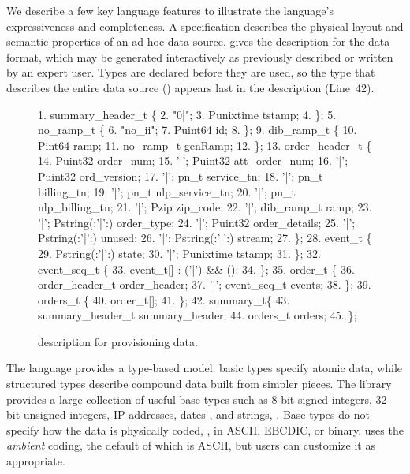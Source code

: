 We describe a few key language features to illustrate the language's
expressiveness and completeness.  A \pads{} specification describes
the physical layout and semantic properties of an ad hoc data source.
 gives the \pads{} description for the
\dibbler{} data format, which may be generated interactively as
previously described or written by an expert user.  Types are declared
before they are used, so the type that describes the entire data
source () appears last in the description (Line~42).
\begin{figure}
\begin{scriptsize}
\begin{code}
{ 1}.   summary\_header\_t \{
{ 2}.  "0|";
{ 3}.  Punixtime tstamp;
{ 4}. \};
{ 5}.  no\_ramp\_t \{
{ 6}.  "no\_ii";
{ 7}.  Puint64 id;
{ 8}. \};
{ 9}.  dib\_ramp\_t \{
{10}.   Pint64     ramp;
{11}.   no\_ramp\_t  genRamp;
{12}. \};
{13}.  order\_header\_t \{
{14}.        Puint32             order\_num;
{15}.  '|';  Puint32             att\_order\_num;
{16}.  '|';  Puint32             ord\_version;
{17}.  '|';   pn\_t           service\_tn;
{18}.  '|';   pn\_t           billing\_tn;
{19}.  '|';   pn\_t           nlp\_service\_tn;
{20}.  '|';   pn\_t           nlp\_billing\_tn;
{21}.  '|';   Pzip           zip\_code;
{22}.  '|';  dib\_ramp\_t          ramp;
{23}.  '|';  Pstring(:'|':)      order\_type;
{24}.  '|';  Puint32             order\_details;
{25}.  '|';  Pstring(:'|':)      unused;
{26}.  '|';  Pstring(:'|':)      stream;
{27}. \};
{28}.  event\_t \{
{29}.        Pstring(:'|':)    state;   
{30}.   '|'; Punixtime         tstamp;
{31}. \};
{32}.  event\_seq\_t \{
{33}.   event\_t[] : ('|') && ();
{34}. \};
{35}.   order\_t \{
{36}.        order\_header\_t  order\_header;
{37}.   '|'; event\_seq\_t     events;
{38}. \};
{39}.  orders\_t \{
{40}.   order\_t[];
{41}. \};
{42}.   summary\_t\{
{43}.   summary\_header\_t  summary\_header;
{44}.   orders\_t          orders;
{45}. \};
\end{code}
\end{scriptsize}
\caption{\pads{} description for \dibbler{} provisioning data.}
\label{figure:dibbler}
\end{figure}

The language provides a type-based model: basic types specify atomic
data, while structured types describe compound data built from simpler
pieces.  The \pads{} library provides a large collection of useful
base types such as 8-bit signed integers, 32-bit unsigned integers, IP
addresses, dates , and strings, \etc{}.  Base types do not specify how
the data is physically coded, \ie{}, in ASCII, EBCDIC, or binary.  \pads{} uses
the \textit{ambient} coding, the default of which is ASCII, but users
can customize it as appropriate.

